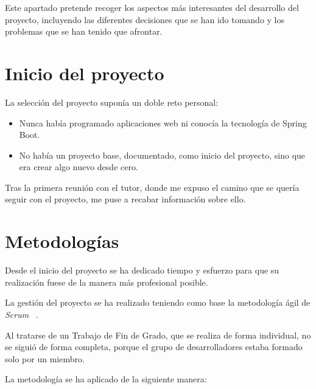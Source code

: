 
Este apartado pretende recoger los aspectos más interesantes del desarrollo del proyecto, incluyendo las diferentes decisiones que se han ido tomando y los problemas que se han tenido que afrontar.

\section{Inicio del proyecto}

La selección del proyecto suponía un doble reto personal:

\begin{itemize}
	\item Nunca había programado aplicaciones web ni conocía la tecnología de Spring Boot.
	\item No había un proyecto base, documentado, como inicio del proyecto, sino que era crear algo nuevo desde cero.
\end{itemize}

Tras la primera reunión con el tutor, donde me expuso el camino que se quería seguir con el proyecto, me puse a recabar información sobre ello.

\section{Metodologías}

Desde el inicio del proyecto se ha dedicado tiempo y esfuerzo para que su realización fuese de la manera más profesional posible.

La gestión del proyecto se ha realizado teniendo como base la metodología ágil de \textit{Scrum} ~\cite{web:scrum}.

Al tratarse de un Trabajo de Fin de Grado, que se realiza de forma individual, no se siguió de forma completa, porque el grupo de desarrolladores estaba formado solo por un miembro.

La metodología se ha aplicado de la siguiente manera:

